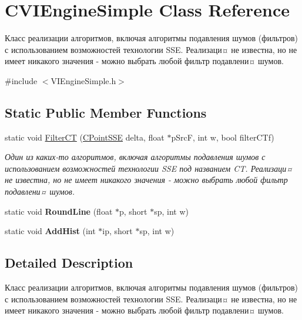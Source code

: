 \hypertarget{class_c_v_i_engine_simple}{\section{C\+V\+I\+Engine\+Simple Class Reference}
\label{class_c_v_i_engine_simple}
}


Класс реализации алгоритмов, включая алгоритмы подавления шумов (фильтров) с использованием возможностей технологии S\+S\+E. Реализаци¤ не известна, но не имеет никакого значения -\/ можно выбрать любой фильтр подавлени¤ шумов.  




{\ttfamily \#include $<$V\+I\+Engine\+Simple.\+h$>$}

\subsection*{Static Public Member Functions}
\begin{DoxyCompactItemize}
\item 
static void \hyperlink{class_c_v_i_engine_simple_a2b0441394c18c07d7d90fb13998c0355}{Filter\+C\+T} (\hyperlink{class_c_point_s_s_e}{C\+Point\+S\+S\+E} delta, float $\ast$p\+Src\+F, int w, bool filter\+C\+Tf)
\begin{DoxyCompactList}\small\item\em Один из каких-\/то алгоритмов, включая алгоритмы подавления шумов с использованием возможностей технологии S\+S\+E под названием C\+T. Реализаци¤ не известна, но не имеет никакого значения -\/ можно выбрать любой фильтр подавлени¤ шумов. \end{DoxyCompactList}\item 
\hypertarget{class_c_v_i_engine_simple_a607ec0a835e39493e7d5271ad1ff1b4c}{static void {\bfseries Round\+Line} (float $\ast$p, short $\ast$sp, int w)}\label{class_c_v_i_engine_simple_a607ec0a835e39493e7d5271ad1ff1b4c}

\item 
\hypertarget{class_c_v_i_engine_simple_a41c72e5c5e19dfbd2a7e97c7ec4952c2}{static void {\bfseries Add\+Hist} (int $\ast$ip, short $\ast$sp, int w)}\label{class_c_v_i_engine_simple_a41c72e5c5e19dfbd2a7e97c7ec4952c2}

\end{DoxyCompactItemize}


\subsection{Detailed Description}
Класс реализации алгоритмов, включая алгоритмы подавления шумов (фильтров) с использованием возможностей технологии S\+S\+E. Реализаци¤ не известна, но не имеет никакого значения -\/ можно выбрать любой фильтр подавлени¤ шумов. 



